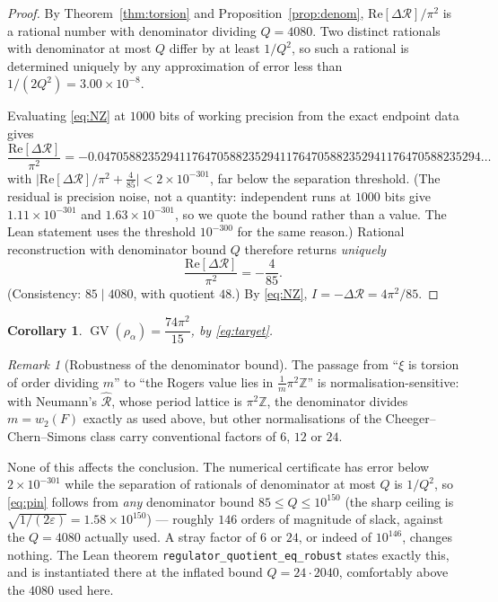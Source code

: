 \documentclass[11pt]{article}
\newtheorem{corollary}[theorem]{Corollary}
\theoremstyle{remark}
\newtheorem{remark}[theorem]{Remark}
\DeclareMathOperator{\GV}{GV}
\newcommand{\ZZ}{\mathbb{Z}}
\begin{document}
\begin{proof}
By Theorem~\ref{thm:torsion} and Proposition~\ref{prop:denom},
$\mathrm{Re}[\Delta\mathcal R]/\pi^2$ is a rational number with denominator
dividing $Q=4080$. Two distinct rationals with denominator at most $Q$ differ by
at least $1/Q^2$, so such a rational is determined uniquely by any approximation
of error less than $1/(2Q^2)=3.00\times10^{-8}$.

Evaluating \eqref{eq:NZ} at $1000$ bits of working precision from the exact
endpoint data gives
\[
\frac{\mathrm{Re}[\Delta\mathcal R]}{\pi^2}
=-0.0470588235294117647058823529411764705882352941176470588235294\ldots
\]
with
$\bigl|\mathrm{Re}[\Delta\mathcal R]/\pi^2+\tfrac4{85}\bigr|
<2\times10^{-301}$,
far below the separation threshold. (The residual is precision noise, not a
quantity: independent runs at $1000$ bits give $1.11\times10^{-301}$ and
$1.63\times10^{-301}$, so we quote the bound rather than a value. The Lean
statement uses the threshold $10^{-300}$ for the same reason.) Rational reconstruction with denominator
bound $Q$ therefore returns \emph{uniquely}
\begin{equation}\label{eq:pin}
\frac{\mathrm{Re}[\Delta\mathcal R]}{\pi^2}=-\frac4{85}.
\end{equation}
(Consistency: $85\mid4080$, with quotient $48$.) By \eqref{eq:NZ},
$I=-\Delta\mathcal R=4\pi^2/85$.
\end{proof}

\begin{corollary}
$\GV(\rho_\alpha)=\dfrac{74\pi^2}{15}$, by \eqref{eq:target}.
\end{corollary}

\begin{remark}[Robustness of the denominator bound]\label{rem:robust}
The passage from ``$\xi$ is torsion of order dividing $m$'' to ``the Rogers value
lies in $\tfrac1m\pi^2\ZZ$'' is normalisation-sensitive: with Neumann's
$\widehat{\mathcal R}$, whose period lattice is $\pi^2\ZZ$, the denominator
divides $m=w_2(F)$ exactly as used above, but other normalisations of the
Cheeger--Chern--Simons class carry conventional factors of $6$, $12$ or $24$.

None of this affects the conclusion. The numerical certificate has error
below $2\times10^{-301}$ while the separation of rationals of denominator at most $Q$
is $1/Q^2$, so \eqref{eq:pin} follows from \emph{any} denominator bound
$85\le Q\le 10^{150}$ (the sharp ceiling is $\sqrt{1/(2\varepsilon)}=1.58\times10^{150}$) --- roughly $146$ orders of magnitude of slack, against the $Q=4080$ actually used. A stray
factor of $6$ or $24$, or indeed of $10^{146}$, changes nothing. The Lean theorem
\texttt{regulator\_quotient\_eq\_robust} states exactly this, and is instantiated
there at the inflated bound $Q=24\cdot2040$, comfortably above the $4080$ used here.
\end{remark}
\end{document}
